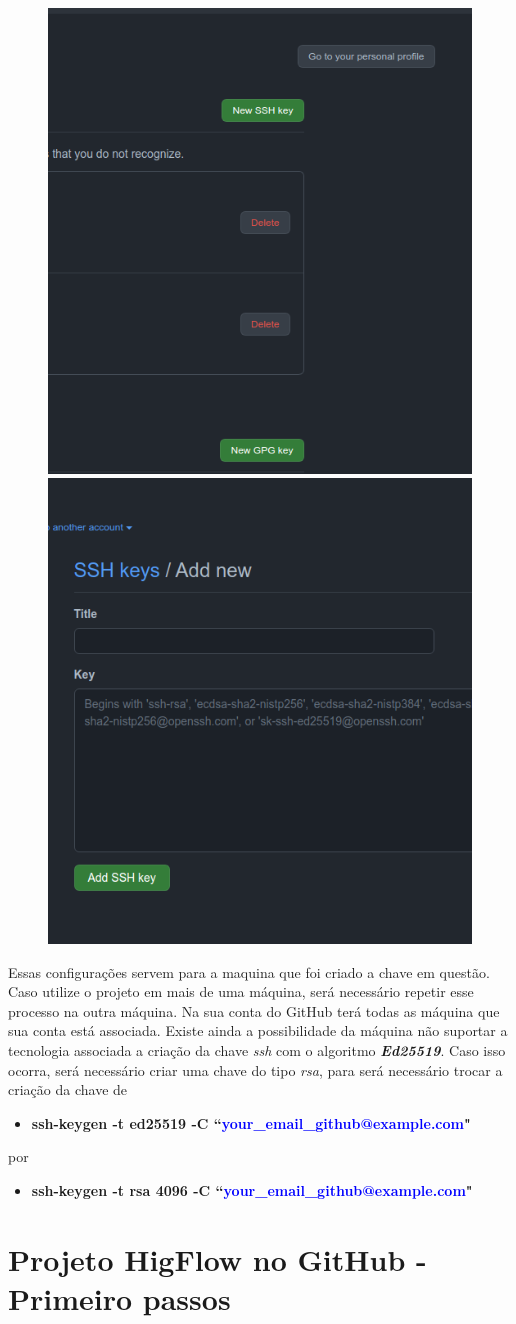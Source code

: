 \documentclass[12pt]{article}
\begin{document}
\begin{figure}[htb]
	\centering
	\includegraphics[width=0.4\linewidth]{figures/ssh_3}
	\includegraphics[width=0.4\linewidth]{figures/ssh_4}
\end{figure}

Essas configurações servem para a maquina que foi criado a chave em questão. Caso utilize o projeto em mais de uma máquina, será necessário repetir esse processo na outra máquina. Na sua conta do GitHub terá todas as máquina que sua conta está associada. 
Existe ainda a possibilidade da máquina não suportar a tecnologia associada a criação da chave \textit{ssh} com o algoritmo \textit{\textbf{Ed25519}}. Caso isso ocorra, será necessário criar uma chave do tipo \textit{rsa}, para será necessário trocar a criação da chave de
\begin{itemize}
	\item \textbf{ssh-keygen -t ed25519 -C ``\textcolor{blue}{your\_email\_github@example.com}"}
\end{itemize}
por
\begin{itemize}
	\item \textbf{ssh-keygen -t rsa 4096 -C ``\textcolor{blue}{your\_email\_github@example.com}"}
\end{itemize}

\section{Projeto HigFlow no GitHub - Primeiro passos}\label{sec:github_higflow}
\end{document}
